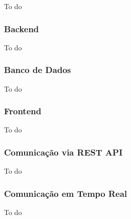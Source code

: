 To do

\subsubsection{Backend}

To do

\subsubsection{Banco de Dados}

To do 


\subsubsection{Frontend}

To do

\subsubsection{Comunicação via REST API}

To do

\subsubsection{Comunicação em Tempo Real}

To do
